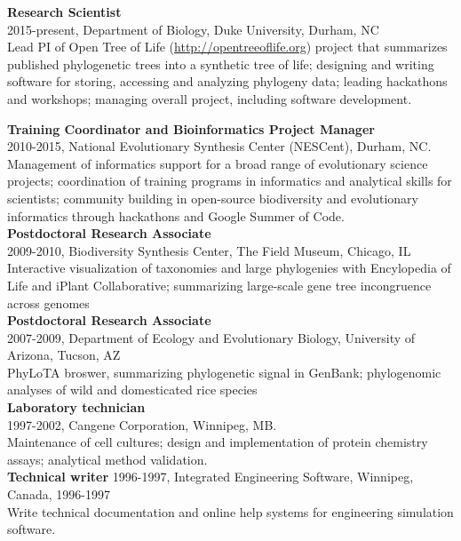 \documentclass[10pt]{article}
\begin{document}
\noindent \textbf{Research Scientist} \\
2015-present, Department of Biology, Duke University, Durham, NC \\
Lead PI of Open Tree of Life (\url{http://opentreeoflife.org}) project that summarizes published phylogenetic trees into a synthetic tree of life; designing and writing software for storing, accessing and analyzing phylogeny data; leading hackathons and workshops; managing overall project, including software development.

\noindent \textbf{Training Coordinator and Bioinformatics Project Manager} \\
2010-2015, National Evolutionary Synthesis Center (NESCent), Durham, NC. \\
Management of informatics support for a broad range of evolutionary science projects; coordination of training programs in informatics and analytical skills for scientists; community building in open-source biodiversity and evolutionary informatics through hackathons and Google Summer of Code. \\

\noindent \textbf{Postdoctoral Research Associate} \\
2009-2010, Biodiversity Synthesis Center, The Field Museum, Chicago, IL  \\
Interactive visualization of taxonomies and large phylogenies with Encylopedia of Life and iPlant Collaborative; summarizing large-scale gene tree incongruence across genomes \\

\noindent \textbf{Postdoctoral Research Associate} \\
2007-2009, Department of Ecology and Evolutionary Biology, University of Arizona, Tucson, AZ \\
PhyLoTA broswer, summarizing phylogenetic signal in GenBank; phylogenomic analyses of wild and domesticated rice species \\ 

\noindent \textbf{Laboratory technician} \\
1997-2002, Cangene Corporation, Winnipeg, MB. \\
Maintenance of cell cultures; design and implementation of protein chemistry assays; analytical method validation. \\

\noindent \textbf{Technical writer}
1996-1997, Integrated Engineering Software, Winnipeg, Canada, 1996-1997 \\
Write technical documentation and online help systems for engineering simulation software. \\
\end{document}
